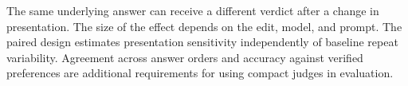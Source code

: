 The same underlying answer can receive a different verdict after a change in presentation. The size of the effect depends on the edit, model, and prompt. The paired design estimates presentation sensitivity independently of baseline repeat variability. Agreement across answer orders and accuracy against verified preferences are additional requirements for using compact judges in evaluation.
